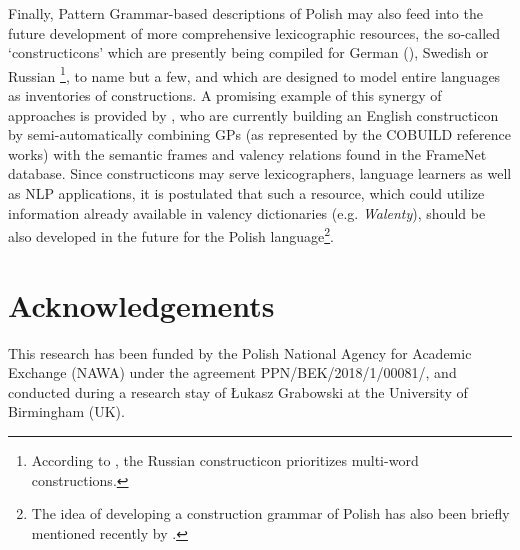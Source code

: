 \documentclass[output=paper]{langscibook}
\begin{document}
Finally, Pattern Grammar-based descriptions of Polish may also feed into the future development of more comprehensive lexicographic resources, the so-called ‘constructicons’ which are presently being compiled for  German (\citealt{BoasZiem2018}), Swedish \citep{LyngfeltEtAl2018AtWork} or Russian \citep{JandaEtAl2018}\footnote{According to \citet[165]{JandaEtAl2018}, the Russian constructicon prioritizes multi-word constructions.}, to name but a few, and which are designed to model entire languages as inventories of constructions. A promising example of this synergy of approaches is provided by \citet{PerekPatten2019}, who are currently building an English constructicon by semi-automatically combining GPs (as represented by the COBUILD reference works) with the semantic frames and valency relations found in the FrameNet database. Since constructicons may serve lexicographers, language learners as well as NLP applications, it is postulated that such a resource, which could utilize information already available in valency dictionaries (e.g. \textit{Walenty}), should be also developed in the future for the Polish language\footnote{The idea of developing a construction grammar of Polish has also been briefly mentioned recently by \citet{Wierzbicka-Piotrowska2019}.}.


\section*{Acknowledgements}
This research has been funded by the Polish National Agency for Academic Exchange (NAWA) under the agreement PPN/BEK/2018/1/00081/, and conducted during a research stay of Łukasz Grabowski at the University of Birmingham (UK).

{\sloppy\printbibliography[heading=subbibliography,notkeyword=this]}
\end{document}

